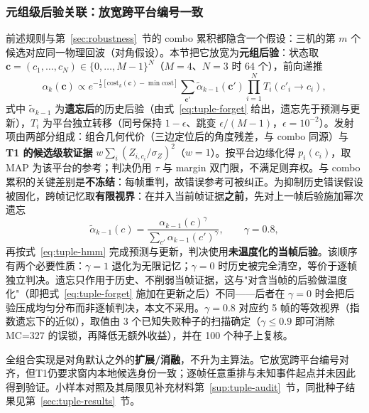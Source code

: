 \documentclass[UTF8,a4paper,zihao=-4]{ctexart}
\begin{document}
\subsubsection{元组级后验关联：放宽跨平台编号一致}\label{sec:tuple}

前述规则与第~\ref{sec:robustness}~节的 combo 累积都隐含一个假设：三机的第 \(m\) 个候选对应同一物理回波（对角假设）。本节把它放宽为\textbf{元组后验}：状态取 \(\boldsymbol c=(c_1,\dots,c_N)\in\{0,\dots,M-1\}^N\)（\(M=4\)、\(N=3\) 时 64 个），前向递推
\begin{equation}
\alpha_k(\boldsymbol c)\propto e^{-\frac12[\mathrm{cost}_k(\boldsymbol c)-\min\mathrm{cost}]}\sum_{\boldsymbol c'}\tilde\alpha_{k-1}(\boldsymbol c')\prod_{i=1}^{N}T_i(c'_i\to c_i),
\label{eq:tuple-hmm}
\end{equation}
式中 \(\tilde\alpha_{k-1}\) 为\textbf{遗忘后}的历史后验（由式~\eqref{eq:tuple-forget} 给出，遗忘先于预测与更新），\(T_i\) 为平台独立转移（同号保持 \(1-\epsilon\)、跳变 \(\epsilon/(M-1)\)，\(\epsilon=10^{-2}\)）。发射项由两部分组成：组合几何代价（三边定位后的角度残差，与 combo 同源）与 \textbf{T1 的候选级软证据} \(w\sum_i (Z_{i,c_i}/\sigma_Z)^2\)（\(w=1\)）。按平台边缘化得 \(p_i(c_i)\)，取 MAP 为该平台的参考；判决仍用 \(\tau\) 与 margin 双门限，不满足则弃权。与 combo 累积的关键差别是\textbf{不冻结}：每帧重判，故错误参考可被纠正。为抑制历史错误假设被固化，跨帧记忆取\textbf{有限视界}：在并入当前帧证据\textbf{之前}，先对上一帧后验施加幂次遗忘
\begin{equation}
\tilde\alpha_{k-1}(c)=\frac{\alpha_{k-1}(c)^{\gamma}}{\sum_{c'}\alpha_{k-1}(c')^{\gamma}},\qquad \gamma=0.8,
\label{eq:tuple-forget}
\end{equation}
再按式~\eqref{eq:tuple-hmm} 完成预测与更新，判决使用\textbf{未温度化的当帧后验}。该顺序有两个必要性质：$\gamma=1$ 退化为无限记忆；$\gamma=0$ 时历史被完全清空，等价于逐帧独立判决。遗忘只作用于历史、不削弱当帧证据，这与"对含当帧的后验做温度化"（即把式~\eqref{eq:tuple-forget} 施加在更新之后）不同——后者在 $\gamma=0$ 时会把后验压成均匀分布而非逐帧判决，本文不采用。$\gamma=0.8$ 对应约 5 帧的等效视界（指数遗忘下的近似），取值由 3 个已知失败种子的扫描确定（$\gamma\le0.9$ 即可消除 MC=327 的误锁，再降低无额外收益），并在 100 个种子上复核。

全组合实现是对角默认之外的\textbf{扩展/消融}，不升为主算法。它放宽跨平台编号对齐，但T1仍要求窗内本地候选身份一致；逐帧任意重排与未知事件起点并未因此得到验证。小样本对照及其局限见补充材料第~\ref{sup:tuple-audit}~节，同批种子结果见第~\ref{sec:tuple-results}~节。
\end{document}

